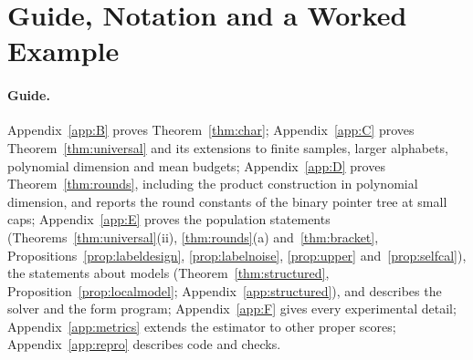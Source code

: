 \section{Guide, Notation and a Worked Example}\label{app:notation}
\paragraph{Guide.}
Appendix~\ref{app:B} proves Theorem~\ref{thm:char}; Appendix~\ref{app:C} proves Theorem~\ref{thm:universal} and its extensions to finite samples, larger alphabets, polynomial dimension and mean budgets; Appendix~\ref{app:D} proves Theorem~\ref{thm:rounds}, including the product construction in polynomial dimension, and reports the round constants of the binary pointer tree at small caps; Appendix~\ref{app:E} proves the population statements (Theorems~\ref{thm:universal}(ii), \ref{thm:rounds}(a) and~\ref{thm:bracket}, Propositions~\ref{prop:labeldesign}, \ref{prop:labelnoise}, \ref{prop:upper} and~\ref{prop:selfcal}), the statements about models (Theorem~\ref{thm:structured}, Proposition~\ref{prop:localmodel}; Appendix~\ref{app:structured}), and describes the solver and the form program; Appendix~\ref{app:F} gives every experimental detail; Appendix~\ref{app:metrics} extends the estimator to other proper scores; Appendix~\ref{app:repro} describes code and checks.

